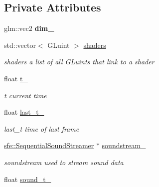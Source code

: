 \subsection*{Private Attributes}
\begin{DoxyCompactItemize}
\item 
\hypertarget{classglrenderer_a6d797cf041a7b0e41d2fb7143e5cdd50}{glm\+::vec2 {\bfseries dim\+\_\+}}\label{classglrenderer_a6d797cf041a7b0e41d2fb7143e5cdd50}

\item 
\hypertarget{classglrenderer_acfd79b958ddd8151a6f309a699ee7993}{std\+::vector$<$ G\+Luint $>$ \hyperlink{classglrenderer_acfd79b958ddd8151a6f309a699ee7993}{shaders}}\label{classglrenderer_acfd79b958ddd8151a6f309a699ee7993}

\begin{DoxyCompactList}\small\item\em shaders a list of all G\+Luints that link to a shader \end{DoxyCompactList}\item 
\hypertarget{classglrenderer_ad66b91cdaa22164b04bed33c5cb871e5}{float \hyperlink{classglrenderer_ad66b91cdaa22164b04bed33c5cb871e5}{t\+\_\+}}\label{classglrenderer_ad66b91cdaa22164b04bed33c5cb871e5}

\begin{DoxyCompactList}\small\item\em t current time \end{DoxyCompactList}\item 
\hypertarget{classglrenderer_ac4458e650ddb3f8a2ed453894f90c678}{float \hyperlink{classglrenderer_ac4458e650ddb3f8a2ed453894f90c678}{last\+\_\+t\+\_\+}}\label{classglrenderer_ac4458e650ddb3f8a2ed453894f90c678}

\begin{DoxyCompactList}\small\item\em last\+\_\+t time of last frame \end{DoxyCompactList}\item 
\hypertarget{classglrenderer_a817bd1af09fff95e86e34ccc888f5424}{\hyperlink{classsfe_1_1_sequential_sound_streamer}{sfe\+::\+Sequential\+Sound\+Streamer} $\ast$ \hyperlink{classglrenderer_a817bd1af09fff95e86e34ccc888f5424}{soundstream\+\_\+}}\label{classglrenderer_a817bd1af09fff95e86e34ccc888f5424}

\begin{DoxyCompactList}\small\item\em soundstream used to stream sound data \end{DoxyCompactList}\item 
\hypertarget{classglrenderer_a91c7277b1eaef67da6e862123ddbfa38}{float \hyperlink{classglrenderer_a91c7277b1eaef67da6e862123ddbfa38}{sound\+\_\+t\+\_\+}}\label{classglrenderer_a91c7277b1eaef67da6e862123ddbfa38}


\end{DoxyCompactItemize}
